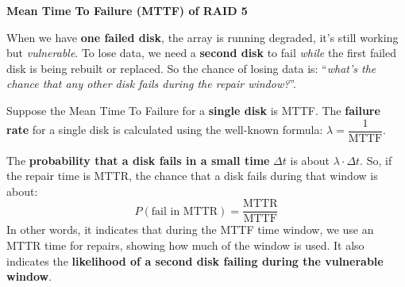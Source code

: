 \highspace
\begin{flushleft}
    \textcolor{Green3}{ \textbf{Mean Time To Failure (MTTF) of RAID 5}}
\end{flushleft}
When we have \textbf{one failed disk}, the array is running degraded, it's still working but \emph{vulnerable}. To lose data, we need a \textbf{second disk} to fail \emph{while} the first failed disk is being rebuilt or replaced. So the chance of losing data is: ``\emph{what's the chance that any other disk fails during the repair window?}''.

\highspace
Suppose the Mean Time To Failure for a \textbf{single disk} is MTTF. The \textbf{failure rate} for a single disk is calculated using the well-known formula: $\lambda = \dfrac{1}{\text{MTTF}}$.

\highspace
The \textbf{probability that a disk fails in a small time} $\Delta t$ is about $\lambda \cdot \Delta t$. So, if the repair time is MTTR, the chance that a disk fails during that window is about:
\begin{equation}\label{eq: RAID 5 - probability that a disk fails in a small time}
    P(\text{fail in MTTR}) = \dfrac{\text{MTTR}}{\text{MTTF}}
\end{equation}
In other words, it indicates that during the MTTF time window, we use an MTTR time for repairs, showing how much of the window is used. It also indicates the \textbf{likelihood of a second disk failing during the vulnerable window}.

\newpage

